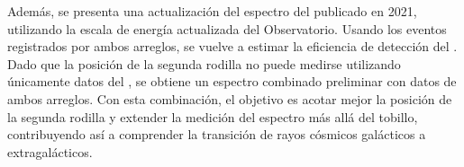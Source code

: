 Además, se presenta una actualización del espectro del  publicado en 2021, utilizando la escala de energía actualizada del Observatorio.
Usando los eventos registrados por ambos arreglos, se vuelve a estimar la eficiencia de detección del .
Dado que la posición de la segunda rodilla no puede medirse utilizando únicamente datos del , se obtiene un espectro combinado preliminar con datos de ambos arreglos.
Con esta combinación, el objetivo es acotar mejor la posición de la segunda rodilla y extender la medición del espectro más allá del tobillo, contribuyendo así a comprender la transición de rayos cósmicos galácticos a extragalácticos.
